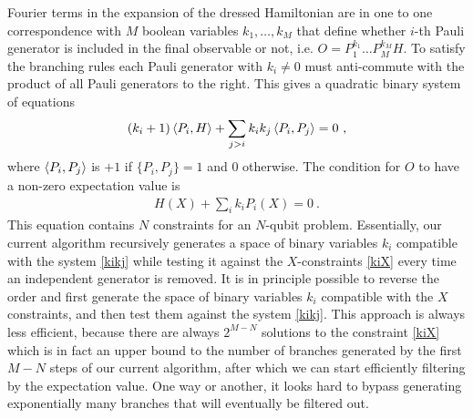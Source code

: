 \documentclass[twocolumn, amsfonts, amssymb, aps, nofootinbib]{revtex4-2}
\begin{document}
Fourier terms in the expansion of the dressed Hamiltonian are in one to one correspondence with $M$ boolean variables $k_1,\dots, k_M$ that define whether $i$-th Pauli generator is included in the final observable or not, i.e. $O=P_1^{k_1}\dots P_M^{k_M}H$. To satisfy the branching rules each Pauli generator with $k_i\neq 0$ must anti-commute with the product of all Pauli generators to the right. This gives a quadratic binary system of equations
\begin{align}
	(k_i+1)\braket{P_i, H}+\sum_{j>i} k_ik_j \braket{P_i, P_j}=0 \ , \label{kikj}
\end{align}
where $\braket{P_i, P_j}$ is $+1$ if $\{P_i,P_j\}=1$ and 0 otherwise. The condition for $O$ to have a non-zero expectation value is 
\begin{align}
	H(X)+\sum_i k_i P_i(X)=0 \ . \label{kiX}
\end{align}
This equation contains $N$ constraints for an $N$-qubit problem.
Essentially, our current algorithm recursively generates a space of binary variables $k_i$ compatible with the system \eqref{kikj} while testing it against the $X$-constraints \eqref{kiX} every time an independent generator is removed. It is in principle possible to reverse the order and first generate the space of binary variables $k_i$ compatible with the $X$ constraints, and then test them against the system \eqref{kikj}. This approach is always less efficient, because there are always $2^{M-N}$ solutions to the constraint \eqref{kiX} which is in fact an upper bound to the number of branches generated by the first $M-N$ steps of our current algorithm, after which we can start efficiently filtering by the expectation value. One way or another, it looks hard to bypass generating exponentially many branches that will eventually be filtered out.
\end{document}
